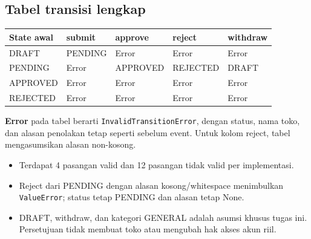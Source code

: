 \documentclass[11pt,a4paper]{article}
\begin{document}
\begin{center}
\end{center}

\subsection{Tabel transisi lengkap}
\small
\begin{tabularx}{\linewidth}{@{}P{2.1cm}YYYY@{}}
\toprule
State awal & submit & approve & reject & withdraw\\\midrule
DRAFT & PENDING & Error & Error & Error\\
PENDING & Error & APPROVED & REJECTED & DRAFT\\
APPROVED & Error & Error & Error & Error\\
REJECTED & Error & Error & Error & Error\\\bottomrule
\end{tabularx}
\normalsize

\textbf{Error} pada tabel berarti \texttt{InvalidTransitionError}, dengan
status, nama toko, dan alasan penolakan tetap seperti sebelum event.
Untuk kolom reject, tabel mengasumsikan alasan non-kosong.

\begin{itemize}
\item Terdapat 4 pasangan valid dan 12 pasangan tidak valid per implementasi.
\item Reject dari PENDING dengan alasan kosong/whitespace menimbulkan
\texttt{ValueError}; status tetap PENDING dan alasan tetap None.
\item DRAFT, withdraw, dan kategori GENERAL adalah asumsi khusus tugas ini.
Persetujuan tidak membuat toko atau mengubah hak akses akun riil.
\end{itemize}
\end{document}
